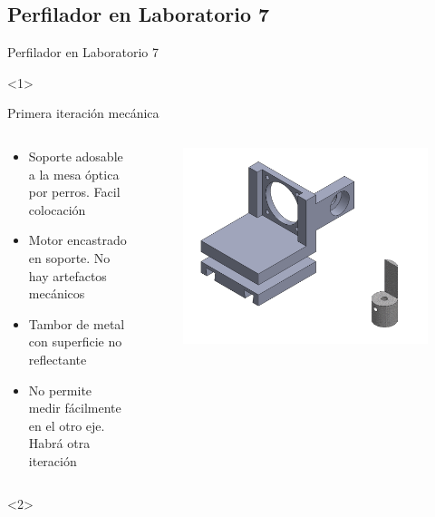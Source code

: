 

\subsection{Perfilador en Laboratorio 7}
\begin{frame}{Perfilador en Laboratorio 7}
    \begin{onlyenv}<1>
        
    
    Primera iteración mecánica
    \begin{columns}[c]
        \begin{column}{0.4\textwidth}
            \begin{itemize}
                \item Soporte adosable a la mesa óptica por perros. Facil colocación
                \item Motor encastrado en soporte. No hay artefactos mecánicos
                \item Tambor de metal con superficie no reflectante
                \item No permite medir fácilmente en el otro eje. Habrá otra iteración
            \end{itemize}
        \end{column}
        \begin{column}{0.5\textwidth}
            \begin{figure}
                \centering
                \includegraphics[width=\textwidth]{fig/perfilador/soporte_labo7_1}
             
                \label{fig:soporte_labo7}
            \end{figure}
        \end{column}
    \end{columns}
    \end{onlyenv}
    \begin{onlyenv}<2>
        

\end{onlyenv}
\end{frame}
